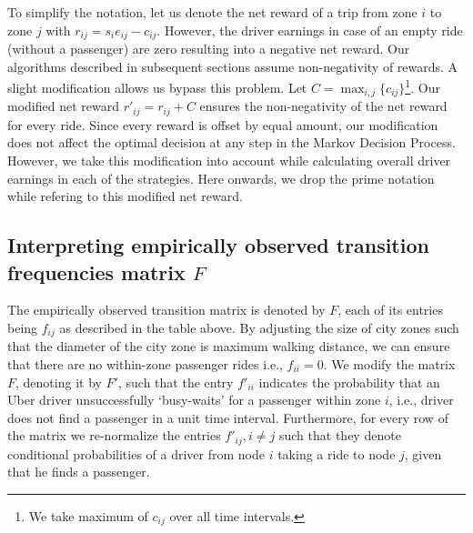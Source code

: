 To simplify the notation, let us denote the net reward of a trip from zone $i$ to zone $j$ with $r_{ij} = s_i e_{ij} - c_{ij}$. However, the driver earnings in case of an empty ride (without a passenger) are zero resulting into a negative net reward. Our algorithms described in subsequent sections assume non-negativity of rewards. A slight modification allows us bypass this problem. Let $C = \max_{i,j}\{c_{ij}\}$\footnote{We take maximum of $c_{ij}$ over all time intervals.}. Our modified net reward $r'_{ij} = r_{ij} + C$ ensures the non-negativity of the net reward for every ride. Since every reward is offset by equal amount, our modification does not affect the optimal decision at any step in the Markov Decision Process. However, we take this modification into account while calculating overall driver earnings in each of the strategies. Here onwards, we drop the prime notation while refering to this modified net reward.
\subsection{Interpreting empirically observed transition frequencies matrix $F$}
The empirically observed transition matrix is denoted by $F$, each of its entries being $f_{ij}$ as described in the table above. By adjusting the size of city zones such that the diameter of the city zone is maximum walking distance, we can ensure that there are no within-zone passenger rides i.e., $f_{ii} = 0$. We modify the matrix $F$, denoting it by $F'$, such that the entry $f'_{ii}$ indicates the probability that an Uber driver unsuccessfully `busy-waits' for a passenger within zone $i$, i.e., driver does not find a passenger in a unit time interval. Furthermore, for every row of the matrix we re-normalize the entries $f'_{ij}, i \neq j$ such that they denote conditional probabilities of a driver from node $i$ taking a ride to node $j$, given that he finds a passenger.

